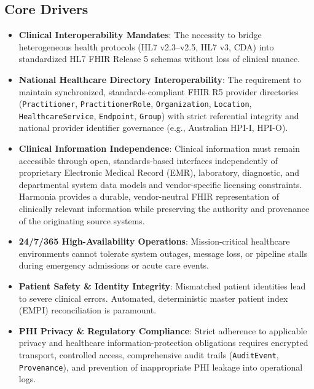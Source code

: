 \subsection{Core Drivers}
\begin{itemize}
    \item \textbf{Clinical Interoperability Mandates}: The necessity to bridge heterogeneous health protocols (HL7 v2.3--v2.5, HL7 v3, CDA) into standardized HL7 FHIR Release 5 schemas without loss of clinical nuance.

    \item \textbf{National Healthcare Directory Interoperability}: The requirement to maintain synchronized, standards-compliant FHIR R5 provider directories (\texttt{Practitioner}, \texttt{PractitionerRole}, \texttt{Organization}, \texttt{Location}, \texttt{HealthcareService}, \texttt{Endpoint}, \texttt{Group}) with strict referential integrity and national provider identifier governance (e.g., Australian HPI-I, HPI-O).

    \item \textbf{Clinical Information Independence}: Clinical information must remain accessible through open, standards-based interfaces independently of proprietary Electronic Medical Record (EMR), laboratory, diagnostic, and departmental system data models and vendor-specific licensing constraints. Harmonia provides a durable, vendor-neutral FHIR representation of clinically relevant information while preserving the authority and provenance of the originating source systems.

    \item \textbf{24/7/365 High-Availability Operations}: Mission-critical healthcare environments cannot tolerate system outages, message loss, or pipeline stalls during emergency admissions or acute care events.

    \item \textbf{Patient Safety \& Identity Integrity}: Mismatched patient identities lead to severe clinical errors. Automated, deterministic master patient index (EMPI) reconciliation is paramount.

    \item \textbf{PHI Privacy \& Regulatory Compliance}: Strict adherence to applicable privacy and healthcare information-protection obligations requires encrypted transport, controlled access, comprehensive audit trails (\texttt{AuditEvent}, \texttt{Provenance}), and prevention of inappropriate PHI leakage into operational logs.
\end{itemize}

